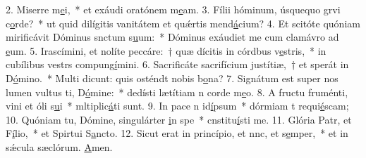 2. Miserre m\uline{e}i,~* et exáudi oratónem m\uline{e}am.
3. Fílii hóminum, úsquequo grvi c\uline{o}rde?~* ut quid dilígitis vanitátem et quǽrtis mend\uline{á}cium?
4. Et scitóte quóniam mirificávit Dóminus snctum s\uline{u}um:~* Dóminus exáudiet me cum clamávro ad \uline{e}um.
5. Irascímini, et nolíte peccáre:~† quæ dícitis in córdbus v\uline{e}stris,~* in cubílibus vestrs compung\uline{í}mini.
6. Sacrificáte sacrifícium justítiæ,~† et sperát in D\uline{ó}mino.~* Multi dicunt: quis osténdt nobis b\uline{o}na?
7. Signátum est super nos lumen vultus ti, D\uline{ó}mine:~* dedísti lætítiam n corde m\uline{e}o.
8. A fructu fruménti, vini et óli s\uline{u}i~* mltiplic\uline{á}ti sunt.
9. In pace n id\uline{í}psum~* dórmiam t requi\uline{é}scam;
10. Quóniam tu, Dómine, singulárter \uline{i}n spe~* cnstitu\uline{í}sti me.
11. Glória Patr, et F\uline{í}lio,~* et Spirtui S\uline{a}ncto.
12. Sicut erat in princípio, et nnc, et s\uline{e}mper,~* et in sǽcula sæclórum. \uline{A}men.
